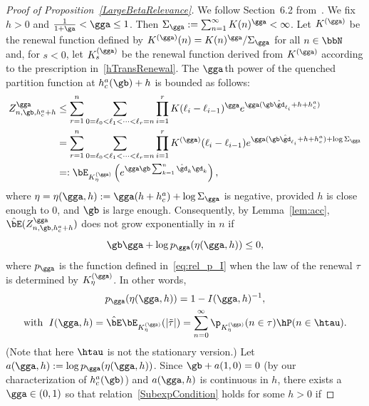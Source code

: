 \begin{proof}[Proof of Proposition~\ref{LargeBetaRelevance}]
We follow Section~6.2 from~\cite{Gi2011}. We fix $h > 0$ and $\tfrac{1}{1 + \ga} < \gga \leq 1$. Then $\Sigma_\gga := \sum_{n=1}^\infty K(n)^\gga < \infty$. Let $K^{(\gga)}$ be the renewal function defined by $K^{(\gga)}(n) = K(n)^\gga / \Sigma_\gga$ for all $n \in \bbN$ and, for $s < 0$, let $K^{(\gga)}_s$ be the renewal function derived from $K^{(\gga)}$ according to the prescription in~\eqref{hTransRenewal}. The $\gga\mskip 1mu$th power of the quenched partition function at $h^a_c(\gb) + h$ is bounded as follows:
\begin{equation}
\begin{aligned}
Z_{n,\gb,h_c^a + h}^\gga &\leq \sum_{r=1}^n \sum_{0 = \ell_0 < \ell_1 < \cdots < \ell_r = n} \prod_{i=1}^r K(\ell_i - \ell_{i-1})^\gga e^{\gga (\gb \hat \gd_{\ell_i} + h + h_c^a)}\\
&= \sum_{r=1}^n \sum_{0 = \ell_0 < \ell_1 < \cdots < \ell_r = n} \prod_{i=1}^r K^{(\gga)}(\ell_i - \ell_{i-1}) e^{\gga (\gb \hat \gd_{\ell_i} + h + h_c^a) + \log \Sigma_\gga}\\
& =: \bE_{{K^{(\gga)}_\eta}} \left(e^{\gga \gb \sum_{k=1}^n \hat \gd_k \gd_k} \right),
\end{aligned}
\end{equation}
where $\eta = \eta(\gga,h) := \gga (h + h^a_c) + \log \Sigma_\gga$ is negative, provided $h$ is close enough to $0$, and $\gb$ is large enough. Consequently, by Lemma~\ref{lem:acc}, $\hat \bE(Z_{n,\gb,h_c^a + h}^\gga)$ does not grow exponentially in $n$ if
\begin{equation}\label{SubexpCondition}
\gb \gga + \log p_\gga(\eta(\gga,h)) \leq 0,
\end{equation}
where $p_\gga$ is the function defined in~\eqref{eq:rel_p_I} when the law of the renewal $\tau$ is determined by $K^{(\gga)}_\eta$. In other words,
\begin{multline}
p_\gga(\eta(\gga,h)) = 1 - I(\gga,h)^{-1}, \\
\text{with }\; I(\gga,h) = \hat \bE \bE_{{K^{(\gga)}_\eta}}(|\tilde \tau|) = \sum_{n=0}^\infty \p_{{K^{(\gga)}_\eta}}(n \in \tau) \hP(n \in \htau).
\end{multline}
(Note that here $\htau$ is not the stationary version.) Let $a(\gga,h) := \log p_\gga(\eta(\gga,h))$. Since $\gb + a(1,0) = 0$ (by our characterization of $h_c^a(\gb)$) and $a(\gga,h)$ is continuous in $h$, there exists a $\gga \in (0,1)$ so that relation~\eqref{SubexpCondition} holds for some $h > 0$ if

\end{proof}
